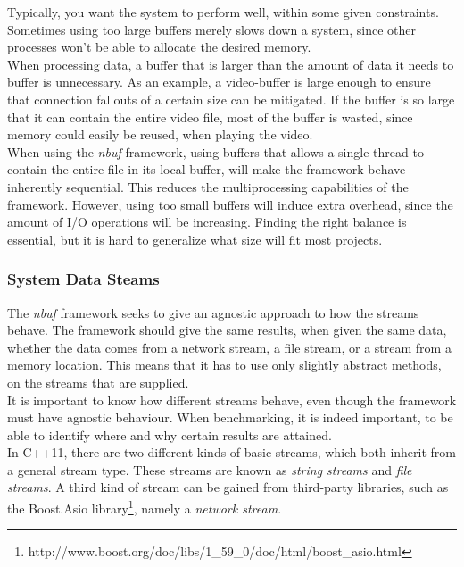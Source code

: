 \documentclass[a4paper]{article}
\newcommand{\nbuf}{\textit{nbuf} }
\begin{document}
Typically, you want the system to perform well, within some given constraints. Sometimes using too large buffers merely slows down a system, since other processes won't be able to allocate the desired memory.\\

When processing data, a buffer that is larger than the amount of data it needs to buffer is unnecessary. As an example, a video-buffer is large enough to ensure that connection fallouts of a certain size can be mitigated. If the buffer is so large that it can contain the entire video file, most of the buffer is wasted, since memory could easily be reused, when playing the video.\\

When using the \nbuf framework, using buffers that allows a single thread to contain the entire file in its local buffer, will make the framework behave inherently sequential. This reduces the multiprocessing capabilities of the framework. However, using too small buffers will induce extra overhead, since the amount of I/O operations will be increasing. Finding the right balance is essential, but it is hard to generalize what size will fit most projects.


\subsubsection{System Data Steams}
The \nbuf framework seeks to give an agnostic approach to how the streams behave. The framework should give the same results, when given the same data, whether the data comes from a network stream, a file stream, or a stream from a memory location. This means that it has to use only slightly abstract methods, on the streams that are supplied.\\

It is important to know how different streams behave, even though the framework must have agnostic behaviour. When benchmarking, it is indeed important, to be able to identify where and why certain results are attained.\\

In C++11, there are two different kinds of basic streams, which both inherit from a general stream type. These streams are known as \textit{string streams} and \textit{file streams}. A third kind of stream can be gained from third-party libraries, such as the Boost.Asio library\footnote{ http://www.boost.org/doc/libs/1\_59\_0/doc/html/boost\_asio.html}, namely a \textit{network stream}.\\
\end{document}
